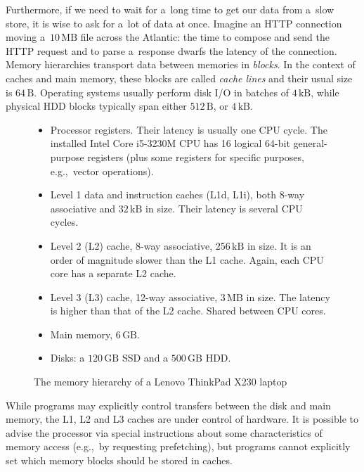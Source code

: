 Furthermore, if we need to wait for a~long time to get our data from a~slow
store, it is wise to ask for a~lot of data at once. Imagine an HTTP connection
moving a~$10\,\text{MB}$ file across the Atlantic: the time to compose and send
the HTTP request and to parse a~response dwarfs the latency of the connection.
Memory hierarchies transport data between memories in \emph{blocks}.
In the context of caches and main memory, these blocks are called
\emph{cache lines} and their usual size is $64\,\text{B}$.
Operating systems usually perform disk I/O in batches of $4\,\text{kB}$,
while physical HDD blocks typically span either $512\,\text{B}$,
or $4\,\text{kB}$.

\begin{figure}
\begin{itemize}
\item Processor registers. Their latency is usually one CPU cycle.
	The installed Intel Core i5-3230M CPU has 16 logical 64-bit
	general-purpose registers (plus some registers for specific purposes,
	e.g.,\ vector operations).
\item Level 1 data and instruction caches (L1d, L1i), both 8-way associative
	and $32\,\text{kB}$ in size. Their latency is several CPU cycles.
\item Level 2 (L2) cache, 8-way associative, $256\,\text{kB}$ in size.
	It is an order of magnitude slower than the L1 cache. Again, each
	CPU core has a separate L2 cache.
\item Level 3 (L3) cache, 12-way associative, $3\,\text{MB}$ in size.
	The latency is higher than that of the L2 cache. Shared between CPU
	cores.
\item Main memory, $6\,\text{GB}$.
\item Disks: a $120\,\text{GB}$ SSD and a $500\,\text{GB}$ HDD.
\end{itemize}
\caption{The memory hierarchy of a Lenovo ThinkPad X230 laptop}
\end{figure}

While programs may explicitly control transfers between the disk and main
memory, the L1, L2 and L3 caches are under control of hardware.
It is possible to advise the processor via special instructions about some
characteristics of memory access (e.g.,\ by requesting prefetching), but
programs cannot explicitly set which memory blocks should be stored in caches.


